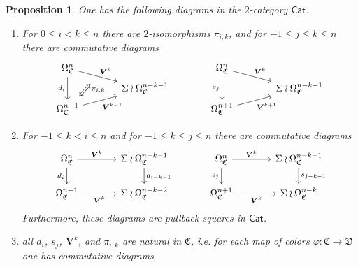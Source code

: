 \documentclass[a4paper,10pt
,draft
]{article}%
\numberwithin{equation}{section}
\numberwithin{figure}{section}
\newtheorem{proposition}[equation]{Proposition}%
\theoremstyle{definition} %
\newcommand{\1}{\ensuremath{\mathbbm 1}}%
\begin{document}
\begin{proposition}\label{CATDIAG PROP}
	One has the following diagrams in the $2$-category
	$\mathsf{Cat}$.
	\begin{enumerate}[label = (\roman*)]
		\item
		For $0\leq i < k \leq n$ there are $2$-isomorphisms  $\pi_{i,k}$,
		and for $-1 \leq j \leq k \leq n$ there are commutative diagrams
		\begin{equation}
		\begin{tikzcd}[row sep = 2pt, column sep = 35pt]
		\Omega_{\mathfrak{C}}^n
		\arrow{dr}[swap,name=U]{}{\boldsymbol{V}^k} \arrow{dd}[swap]{d_i} &
		&
		\Omega_{\mathfrak{C}}^n
		\arrow{dr}{\boldsymbol{V}^k} \arrow{dd}[swap]{s_j} &
		\\
		& \Sigma \wr \Omega_{\mathfrak{C}}^{n-k-1}
		&
		& \Sigma \wr \Omega_{\mathfrak{C}}^{n-k-1}
		\\
		|[alias=V]|
		\Omega_{\mathfrak{C}}^{n-1} \arrow{ur}[swap]{\boldsymbol{V}^{k-1}} &
		&
		\Omega_{\mathfrak{C}}^{n+1} \arrow{ur}[swap]{\boldsymbol{V}^{k+1}} &
		\arrow[Leftrightarrow, from=V, to=U,shorten >=0.15cm,shorten <=0.15cm
		,swap, near end, "\pi_{i,k}"
		]
		\end{tikzcd}
		\end{equation}
		\item
		For $-1 \leq k < i \leq n$ and for $-1 \leq k \leq j \leq n$
		there are commutative diagrams
		\begin{equation}
		\begin{tikzcd}[row sep = 8pt, column sep = 35pt]
		\Omega^n_{\mathfrak{C}}
		\arrow{r}[swap,name=U]{}{\boldsymbol{V}^k} \arrow{dd}[swap]{d_i} &
		\Sigma \wr \Omega^{n-k-1}_{\mathfrak{C}} \ar{dd}{d_{i-k-1}}
		&
		\Omega^n_{\mathfrak{C}}
		\arrow{r}{\boldsymbol{V}^k} \arrow{dd}[swap]{s_j} &
		\Sigma \wr \Omega^{n-k-1}_{\mathfrak{C}} \ar{dd}{s_{j-k-1}}
		\\
		\\
		|[alias=V]|
		\Omega^{n-1}_{\mathfrak{C}} \arrow{r}[swap]{\boldsymbol{V}^{k}} &
		\Sigma \wr \Omega^{n-k-2}_{\mathfrak{C}}
		&
		\Omega^{n+1}_{\mathfrak{C}} \arrow{r}[swap]{\boldsymbol{V}^{k}} &
		\Sigma \wr \Omega^{n-k}_{\mathfrak{C}}
		\end{tikzcd}
		\end{equation}
		Furthermore, these diagrams are pullback squares in $\mathsf{Cat}$.
		\item 
		all $d_i$, $s_j$, $\boldsymbol{V}^k$, and $\pi_{i,k}$
		are natural in $\mathfrak{C}$, i.e. for each map of colors
		$\varphi \colon \mathfrak{C} \to \mathfrak{D}$ one has commutative diagrams

\end{enumerate}
\end{proposition}
\end{document}
